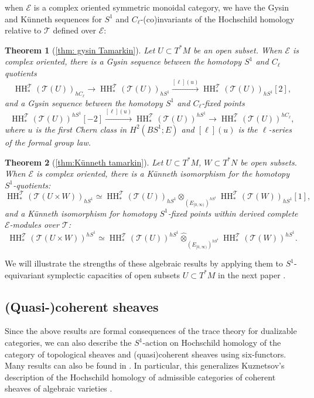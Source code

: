 \documentclass[11pt]{amsart}
\numberwithin{equation}{section}
\theoremstyle{plain}
\newtheorem{Thm}{Theorem}[section]
\theoremstyle{definition}
\theoremstyle{remark}
\newcommand{\cE} { {\mathcal{E}}}
\newcommand{\sT} { {\mathscr{T}}}
\newcommand\HH{\operatorname{HH}}
\begin{document}
when $\cE$ is a complex oriented symmetric monoidal category, we have the Gysin and K\"unneth sequences for $S^1$ and $C_\ell$-(co)invariants of the Hochschild homology relative to $\sT$ defined over $\cE$:

\begin{Thm}[\autoref{thm: gysin Tamarkin}]
    Let $U \subset T^*M$ be an open subset. When $\cE$ is complex oriented, there is a Gysin sequence between the homotopy $S^1$ and $C_\ell$ quotients
    \[\HH_*^\sT(\sT(U))_{hC_\ell} \to \HH_*^\sT(\sT(U))_{hS^1} \xrightarrow{[\ell](u)} \HH_*^\sT(\sT(U))_{hS^1}[2],\]
    and a Gysin sequence between the homotopy $S^1$ and $C_\ell$-fixed points
    \[\HH_*^\sT(\sT(U))^{hS^1}[-2] \xrightarrow{[\ell](u)} \HH_*^\sT(\sT(U))^{hS^1} \to \HH_*^\sT(\sT(U))^{hC_\ell},\]
    where $u$ is the first Chern class in $H^2(BS^1; E)$ and $[\ell](u)$ is the $\ell$-series of the formal group law.
\end{Thm}

\begin{Thm}[\autoref{thm:Künneth tamarkin}]
    Let $U \subset T^*M$, $W \subset T^*N$ be open subsets. When $\cE$ is complex oriented, there is a K\"unneth isomorphism for the homotopy $S^1$-quotients:
    \[\HH_*^\sT(\sT(U \times W))_{hS^1} \simeq \HH_*^\sT(\sT(U))_{hS^1} \otimes _{(E_{[0,\infty)})^{hS^1}} \HH_*^\sT(\sT(W))_{hS^1}[1],\]
    and a K\"unneth isomorphism for homotopy $S^1$-fixed points within derived complete $\cE$-modules over $\sT$:
    \[\HH_*^\sT(\sT(U \times W))^{hS^1} \simeq \HH_*^\sT(\sT(U))^{hS^1} \widehat\otimes _{(E_{[0,\infty)})^{hS^1}} \HH_*^\sT(\sT(W))^{hS^1}.\]
\end{Thm}

We will illustrate the strengths of these algebraic results by applying them to $S^1$-equivariant symplectic capacities of open subsets $U \subset T^*M$ in the next paper \cite{Li-Zhang26-2}.

\subsection{(Quasi-)coherent sheaves}
Since the above results are formal consequences of the trace theory for dualizable categories, we can also describe the $S^1$-action on Hochschild homology of the category of topological sheaves and (quasi)coherent sheaves using six-functors. Many results can also be found in \cite{Ben-Zvi-Nadler-trace}. In particular, this generalizes Kuznetsov's description of the Hochschild homology of admissible categories of coherent sheaves of algebraic varieties \cite{KuznetsovHochschild}.
\end{document}
